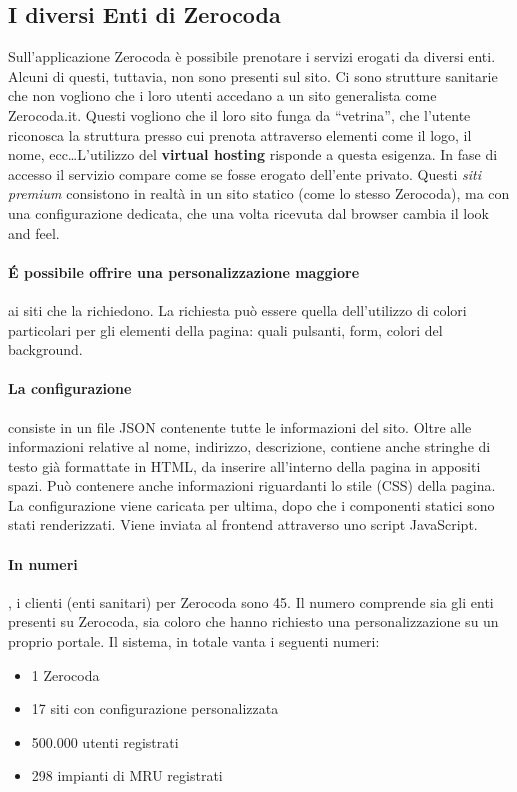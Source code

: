 \subsection{I diversi Enti di Zerocoda}
Sull'applicazione Zerocoda è possibile prenotare i servizi erogati da diversi enti. Alcuni di questi, tuttavia, non sono presenti sul sito. Ci sono strutture sanitarie che non vogliono che i loro utenti accedano a un sito generalista come \textsf{Zerocoda.it}. Questi vogliono che il loro sito funga da ``vetrina'', che l'utente riconosca la struttura presso cui prenota attraverso elementi come il logo, il nome, ecc\dots L'utilizzo del \textbf{virtual hosting} risponde a questa esigenza. In fase di accesso il servizio compare come se fosse erogato dell’ente privato. Questi \textit{siti premium} consistono in realtà in un sito statico (come lo stesso Zerocoda), ma con una configurazione dedicata, che una volta ricevuta dal browser cambia il \textsf{look and feel}.

\paragraph{É possibile offrire una  personalizzazione maggiore} ai siti che la richiedono. La richiesta può essere quella dell'utilizzo di colori particolari per gli elementi della pagina: quali pulsanti, form, colori del background.

\paragraph{La configurazione} consiste in un file JSON contenente tutte le informazioni del sito. Oltre alle informazioni relative al nome, indirizzo, descrizione, contiene anche stringhe di testo già formattate in HTML, da inserire all'interno della pagina in appositi spazi. Può contenere anche informazioni riguardanti lo stile (CSS) della pagina. La configurazione viene caricata per ultima, dopo che i componenti statici sono stati renderizzati. Viene inviata al frontend attraverso uno script JavaScript.

\paragraph{In numeri}, i clienti (enti sanitari) per Zerocoda sono 45. Il numero comprende sia gli enti presenti su Zerocoda, sia coloro che hanno richiesto una personalizzazione su un proprio portale. Il sistema, in totale vanta i seguenti numeri:
\begin{itemize}
    \item 1 Zerocoda
    \item 17 siti con configurazione personalizzata
    \item 500.000 utenti registrati
    \item 298 impianti di MRU registrati
\end{itemize}


